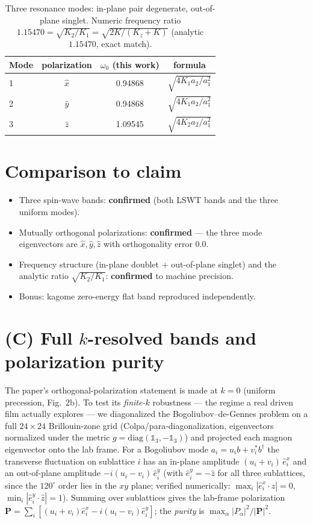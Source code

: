 \documentclass[11pt]{article}
\begin{document}
\begin{table}[h]\centering
\begin{tabular}{lccc}
\toprule
Mode & polarization & $\omega_0$ (this work) & formula \\
\midrule
1 & $\hat x$ & 0.94868 & $\sqrt{4K_1a_2/a_1^2}$ \\
2 & $\hat y$ & 0.94868 & $\sqrt{4K_1a_2/a_1^2}$ \\
3 & $\hat z$ & 1.09545 & $\sqrt{4K_2a_2/a_1^2}$ \\
\bottomrule
\end{tabular}
\caption{Three resonance modes: in-plane pair degenerate, out-of-plane
singlet. Numeric frequency ratio $1.15470 =\sqrt{K_2/K_1}=\sqrt{2K/(K_z+K)}$
(analytic $1.15470$, exact match).}
\end{table}

\section{Comparison to claim}
\begin{itemize}
\item Three spin-wave bands: \textbf{confirmed} (both LSWT bands and the
three uniform modes).
\item Mutually orthogonal polarizations: \textbf{confirmed} --- the three
mode eigenvectors are $\hat x,\hat y,\hat z$ with orthogonality error $0.0$.
\item Frequency structure (in-plane doublet + out-of-plane singlet) and the
analytic ratio $\sqrt{K_2/K_1}$: \textbf{confirmed} to machine precision.
\item Bonus: kagome zero-energy flat band reproduced independently.
\end{itemize}

\section{(C) Full $k$-resolved bands and polarization purity}
\label{sec:kresolved}
The paper's orthogonal-polarization statement is made at $k=0$ (uniform
precession, Fig.~2b). To test its \emph{finite-$k$} robustness --- the
regime a real driven film actually explores --- we diagonalized the
Bogoliubov--de-Gennes problem on a full $24\times24$ Brillouin-zone grid
(Colpa/para-diagonalization, eigenvectors normalized under the metric
$g=\mathrm{diag}(\mathbb 1_3,-\mathbb 1_3)$) and projected each magnon
eigenvector onto the lab frame. For a Bogoliubov mode
$a_i=u_i b+v_i^* b^\dagger$ the transverse fluctuation on sublattice $i$ has
an in-plane amplitude $(u_i+v_i)\,\hat e^{x}_i$ and an out-of-plane amplitude
$-i(u_i-v_i)\,\hat e^{y}_i$ (with $\hat e^{y}_i=-\hat z$ for all three
sublattices, since the $120^\circ$ order lies in the $xy$ plane; verified
numerically: $\max_i|\hat e^x_i\!\cdot\!\hat z|=0$,
$\min_i|\hat e^y_i\!\cdot\!\hat z|=1$). Summing over sublattices gives the
lab-frame polarization $\mathbf P=\sum_i[(u_i+v_i)\hat e^x_i-i(u_i-v_i)\hat
e^y_i]$; the \emph{purity} is $\max_{\alpha}|P_\alpha|^2/|\mathbf P|^2$.
\end{document}
